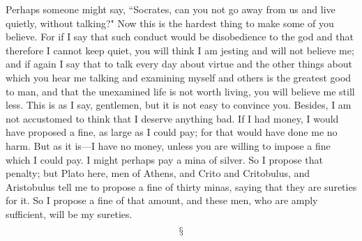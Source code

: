 \documentclass[letterpaper,12pt]{article}
\newcommand{\stephpag}[1]{\marginnote{\small\itshape\fontfamily{ppl}\selectfont #1}}
\begin{document}
Perhaps someone might say, ``Socrates, can you not go away from us and live quietly, without talking?" Now this is the hardest thing to make some of you believe. For if I say that such conduct would be disobedience to the god and that therefore I cannot keep quiet, you will think I am jesting and will not believe me; \stephpag{38 a} and if again I say that to talk every day about virtue and the other things about which you hear me talking and examining myself and others is the greatest good to man, and that the unexamined life is not worth living, you will believe me still less. This is as I say, gentlemen, but it is not easy to convince you. Besides, I am not accustomed to think that I deserve anything bad. If I had money, I would have proposed a fine, \stephpag{b} as large as I could pay; for that would have done me no harm. But as it is---I have no money, unless you are willing to impose a fine which I could pay. I might perhaps pay a mina of silver. So I propose that penalty; but Plato here, men of Athens, and Crito and Critobulus, and Aristobulus tell me to propose a fine of thirty minas, saying that they are sureties for it. So I propose a fine of that amount, and these men, who are amply sufficient, will be my sureties. \stephpag{c}
\[\mathsection\]
\end{document}
